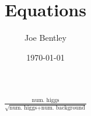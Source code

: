 \documentclass[11pt]{amsart}
\title{Equations}
\author{Joe Bentley}
\date{\today}
\begin{document}
\maketitle

\newpage

\begin{align*}
  \frac{\text{num. higgs}}{\sqrt{\text{num. higgs} + \text{num. background}}}
\end{align*}
\end{document}
